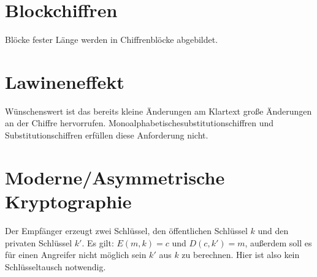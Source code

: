 \section{Blockchiffren}
Blöcke fester Länge werden in Chiffrenblöcke abgebildet.

\section{Lawineneffekt}
Wünschenswert ist das bereits kleine Änderungen am Klartext große Änderungen an der Chiffre hervorrufen.
Monoalphabetischesubstitutionschiffren und Substitutionschiffren erfüllen diese Anforderung nicht.

\section{Moderne/Asymmetrische Kryptographie}
Der Empfänger erzeugt zwei Schlüssel, den öffentlichen Schlüssel $k$ und den privaten Schlüssel $k'$. 
Es gilt: $E(m, k) = c$ und $D(c, k') = m$, außerdem soll es für einen
Angreifer nicht möglich sein $k'$ aus $k$ zu berechnen.
Hier ist also kein Schlüsseltausch notwendig.

